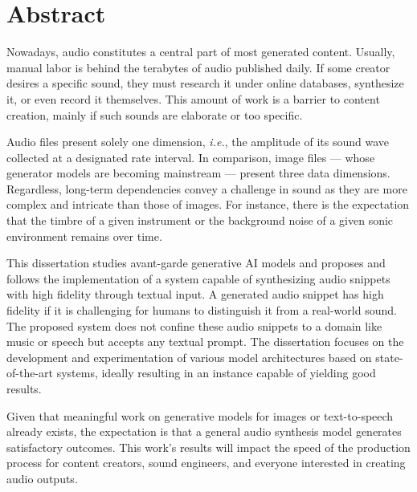 \section*{Abstract}

Nowadays, audio constitutes a central part of most generated content. Usually, manual labor is behind the terabytes of audio published daily. If some creator desires a specific sound, they must research it under online databases, synthesize it, or even record it themselves. This amount of work is a barrier to content creation, mainly if such sounds are elaborate or too specific.

Audio files present solely one dimension, \textit{i.e.}, the amplitude of its sound wave collected at a designated rate interval. In comparison, image files --- whose generator models are becoming mainstream --- present three data dimensions. Regardless, long-term dependencies convey a challenge in sound as they are more complex and intricate than those of images. For instance, there is the expectation that the timbre of a given instrument or the background noise of a given sonic environment remains over time.

This dissertation studies avant-garde generative AI models and proposes and follows the implementation of a system capable of synthesizing audio snippets with high fidelity through textual input. A generated audio snippet has high fidelity if it is challenging for humans to distinguish it from a real-world sound. The proposed system does not confine these audio snippets to a domain like music or speech but accepts any textual prompt. The dissertation focuses on the development and experimentation of various model architectures based on state-of-the-art systems, ideally resulting in an instance capable of yielding good results.

Given that meaningful work on generative models for images or text-to-speech already exists, the expectation is that a general audio synthesis model generates satisfactory outcomes. This work's results will impact the speed of the production process for content creators, sound engineers, and everyone interested in creating audio outputs.
